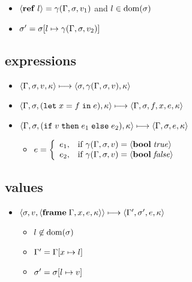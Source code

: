 \documentclass{article}
\begin{document}
\begin{minipage}{\textwidth}
\begin{minipage}[t]{0.50\textwidth}
\begin{itemize}
\begin{itemize}
\item $\langle\mathbf{ref}\; l\rangle=\gamma(\Gamma,\sigma,v_1)$ and $l\in\operatorname{dom}(\sigma)$
\item $\sigma'=\sigma[l\mapsto \gamma(\Gamma,\sigma,v_2)]$
\end{itemize}
\end{itemize}

\end{minipage}
\begin{minipage}[t]{0.50\textwidth}

\subsection{expressions}
\begin{itemize}
\item $\langle\Gamma,\sigma,v,\kappa\rangle \longmapsto \langle \sigma,\gamma(\Gamma,\sigma,v),\kappa \rangle$

\item $\langle\Gamma,\sigma,(\mathtt{let}\; x=f\; \mathtt{in}\; e),\kappa\rangle \longmapsto \langle\Gamma,\sigma,f,x, e, \kappa\rangle$

\item $\langle\Gamma,\sigma,(\mathtt{if}\; v\; \mathtt{then}\; e_1\; \mathtt{else}\; e_2),\kappa\rangle \longmapsto \langle\Gamma,\sigma, e, \kappa\rangle$

\begin{itemize}
  \item $\displaystyle e = \left\{\begin{array}{rl}
e_1, & \text{if } \gamma(\Gamma,\sigma,v) = \langle\mathbf{bool}\; \mathit{true}\rangle \\
e_2, & \text{if } \gamma(\Gamma,\sigma,v) = \langle\mathbf{bool}\; \mathit{false}\rangle
\end{array}\right.$

\end{itemize}
\end{itemize}

\subsection{values}

\begin{itemize}
\item $\langle\sigma,v,\langle\mathbf{frame}\; \Gamma,x,e,\kappa\rangle\rangle \longmapsto \langle\Gamma',\sigma',e,\kappa\rangle$
\begin{itemize}
\item $l\not\in\operatorname{dom}(\sigma)$
\item $\Gamma' = \Gamma[x\mapsto l]$
\item $\sigma' = \sigma[l\mapsto v]$
\end{itemize}
\end{itemize}


\end{minipage}
\end{minipage}
\end{document}
